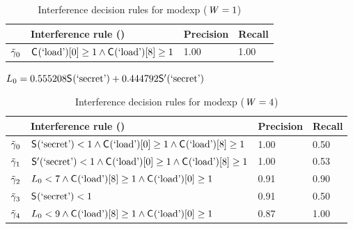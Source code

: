 \begin{table}
{\scriptsize
\caption{Interference decision rules for modexp ($\mathit{W}=1$)}
\label{table:modexp:rule:1}
\begin{tabular}{m{\colR}m{\colRule}m{\colPrecision}m{\colRecall}}
\toprule
 & Interference rule (\interferenceRule{}) & Precision & Recall \\
\midrule
${\tilde{\gamma}}_{0}$&$\mathsf{C}_{}(\textrm{`load'})[0]\ge 1 \wedge
\mathsf{C}_{}(\textrm{`load'})[8]\ge1$&1.00&1.00\\
\bottomrule
\end{tabular}
}
\end{table}
\begin{table}
\begingroup
\everymath{\scriptstyle}
\footnotesize{
\caption{Interference decision rules for modexp ($\mathit{W}=4$)}
\label{table:cache:morerule}
$L_{0}=0.555208\mathsf{S}_{}(\textrm{`secret'})+0.444792\mathsf{S}'_{}(\textrm{`secret'})$\\
\begin{tabular}{m{\colR}m{\colRule}m{\colPrecision}m{\colRecall}}
\toprule
 &Interference rule (\interferenceRule{}) & Precision & Recall \\
\midrule
${\tilde{\gamma}}_{0}$&$  \mathsf{S}_{}(\textrm{`secret'}) <1 \wedge \mathsf{C}_{}(\textrm{`load'})[0]\ge 1 \wedge \mathsf{C}_{}(\textrm{`load'})[8]\ge 1$&1.00&0.50\\
${\tilde{\gamma}}_{1}$&$ \mathsf{S}'_{}(\textrm{`secret'})<1 \wedge
\mathsf{C}_{}(\textrm{`load'})[0]\ge 1 \wedge \mathsf{C}_{}(\textrm{`load'})[8]\ge 1$&1.00&0.53\\
${\tilde{\gamma}}_{2}$&$L_{0}<7 \wedge
\mathsf{C}_{}(\textrm{`load'})[8]\ge 1 \wedge \mathsf{C}_{}(\textrm{`load'})[0]\ge 1$&0.91&0.90\\
${\tilde{\gamma}}_{3}$&$  \mathsf{S}_{}(\textrm{`secret'}) <1$&0.91&0.50\\
${\tilde{\gamma}}_{4}$&$L_{0}<9 \wedge \mathsf{C}_{}(\textrm{`load'})[8]\ge 1 \wedge \mathsf{C}_{}(\textrm{`load'})[0]\ge 1$&0.87&1.00\\
\bottomrule
\end{tabular}
}
\endgroup
\end{table}
